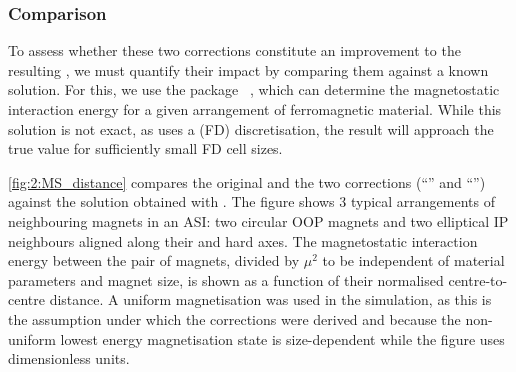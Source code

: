 \subsubsection{Comparison}
To assess whether these two corrections constitute an improvement to the resulting , we must quantify their impact by comparing them against a known solution.
For this, we use the  package \mumax~\cite{mumax3}, which can determine the magnetostatic interaction energy for a given arrangement of ferromagnetic material.
While this solution is not exact, as \mumax uses a  (FD) discretisation, the result will approach the true value for sufficiently small FD cell sizes. \\\par

\cref{fig:2:MS_distance} compares the original  and the two corrections (``'' and ``'') against the solution obtained with \mumax.
The figure shows 3 typical arrangements of neighbouring magnets in an ASI: two circular OOP magnets and two elliptical IP neighbours aligned along their  and hard axes.
The magnetostatic interaction energy between the pair of magnets, divided by $\mu^2$ to be independent of material parameters and magnet size, is shown as a function of their normalised centre-to-centre distance.
A uniform magnetisation was used in the \mumax simulation, as this is the assumption under which the corrections were derived and because the non-uniform lowest energy magnetisation state is size-dependent while the figure uses dimensionless units. \\\par


